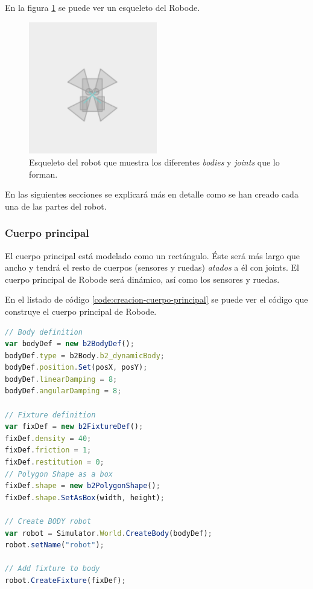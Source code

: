 En la figura \ref{fig:robot-skel} se puede ver un esqueleto del Robode.

\begin{figure}[!ht]
	\begin{centering}
		\includegraphics[width=0.5\textwidth]{images/robot-skel.png}
			\caption{Esqueleto del robot que muestra los diferentes \emph{bodies} y \emph{joints} que lo forman.}
				\label{fig:robot-skel}
	\end{centering}
\end{figure}

En las siguientes secciones se explicará más en detalle como se han creado cada una de las partes del robot.
 
\subsubsection*{Cuerpo principal}
\label{sec:cuerpo-principal}

El cuerpo principal está modelado como un rectángulo. Éste será más largo que ancho y tendrá el resto de cuerpos (sensores y ruedas) \emph{atados} a él con joints. El cuerpo principal de Robode será dinámico, así como los sensores y ruedas.

En el listado de código \ref{code:creacion-cuerpo-principal} se puede ver el código que construye el cuerpo principal de Robode.

\begin{lstlisting}[language={Javascript},label={code:creacion-cuerpo-principal}, caption={Creación del cuerpo principal del robot utilizando la librería Box2dweb.}]
// Body definition
var bodyDef = new b2BodyDef(); 
bodyDef.type = b2Body.b2_dynamicBody;
bodyDef.position.Set(posX, posY);
bodyDef.linearDamping = 8;
bodyDef.angularDamping = 8;

// Fixture definition
var fixDef = new b2FixtureDef(); 
fixDef.density = 40;
fixDef.friction = 1;
fixDef.restitution = 0;
// Polygon Shape as a box
fixDef.shape = new b2PolygonShape(); 
fixDef.shape.SetAsBox(width, height);

// Create BODY robot
var robot = Simulator.World.CreateBody(bodyDef);
robot.setName("robot");

// Add fixture to body
robot.CreateFixture(fixDef);
\end{lstlisting}



